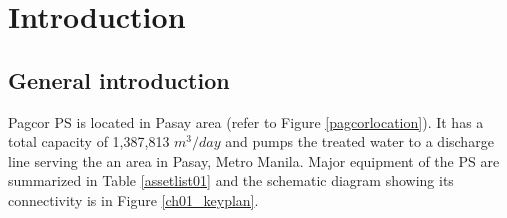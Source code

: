 
\chapter{Introduction} %
\label{Chapter1}

\section{General introduction}
Pagcor PS is located in Pasay area (refer to Figure \ref{pagcorlocation}). It has a total capacity of 1,387,813 $m^3/day$ and pumps the treated water to a discharge line serving the an area in Pasay, Metro Manila. Major equipment of the PS are summarized in Table \ref{assetlist01} and the schematic diagram showing its connectivity is in Figure \ref{ch01_keyplan}.

